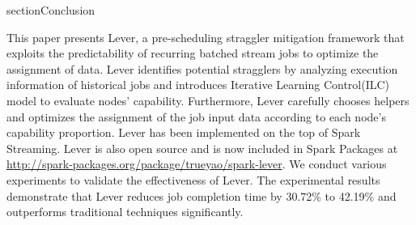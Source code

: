 section{Conclusion}

  This paper presents Lever, a pre-scheduling straggler mitigation framework that exploits the predictability of recurring batched stream jobs to optimize the assignment of data. Lever identifies potential stragglers by analyzing execution information of historical jobs and introduces Iterative Learning Control(ILC) model to evaluate nodes' capability. Furthermore, Lever carefully chooses helpers and optimizes the assignment of the job input data according to each node's capability proportion. Lever has been implemented on the top of Spark Streaming. Lever is also open source and is now included in Spark Packages at \url{http://spark-packages.org/package/trueyao/spark-lever}. We conduct various experiments to validate the effectiveness of Lever. The experimental results demonstrate that Lever reduces job completion time by 30.72\% to 42.19\% and outperforms traditional techniques significantly. 